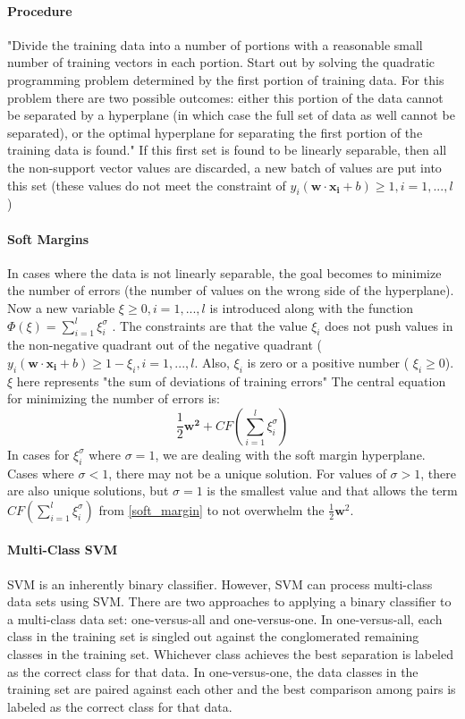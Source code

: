 			\paragraph{Procedure} "Divide the training data into a number of portions with a reasonable small number of training vectors in each portion.  Start out by solving the quadratic programming problem determined by the first portion of training data.  For this problem there are two possible outcomes: either this portion of the data cannot be separated by a hyperplane (in which case the full set of data as well cannot be separated), or the optimal hyperplane for separating the first portion of the training data is found." If this first set is found to be linearly separable, then all the non-support vector values are discarded, a new batch of values are put into this set (these values do not meet the constraint of $y_i(\mathbf{w} \cdot \mathbf{x_i} + b) \ge 1, i = 1,...,{l}$ )
			\paragraph{Soft Margins}
			In cases where the data is not linearly separable, the goal becomes to minimize the number of errors (the number of values on the wrong side of the hyperplane).  Now a new variable $\xi \ge 0, i=1,...,l$ is introduced along with the function $\Phi (\xi) = \sum_{i=1}^{l} \xi_{i}^{\sigma}$ .  The constraints are that the value 
			$\xi_i$ does not push values in the non-negative quadrant out of the negative quadrant ( $y_i(\mathbf{w} \cdot \mathbf{x_i} + b) \ge 1 - \xi_i, i=1,...,l$.  Also, $\xi_i$ is zero or a positive number ( $\xi_i \ge 0$).  $\xi$ here represents "the sum of deviations of training errors"
			The central equation for minimizing the number of errors is:
			\begin{equation}\label{soft_margin}  \frac{1}{2}\mathbf{w^2} + CF(\sum_{i=1}^{l} \xi_{i}^\sigma)\end{equation}
			In cases for $ \xi_{i}^{\sigma} $ where $\sigma=1$, we are dealing with the soft margin hyperplane.  Cases where $\sigma < 1$, there may not be a unique solution.  For values of $\sigma > 1$, there are also unique solutions, but $\sigma =1$ is the smallest value and that allows the term $CF(\sum_{i=1}^{l} \xi_{i}^\sigma)$ from \eqref{soft_margin} to not overwhelm  the $\frac{1}{2}\mathbf{w}^2$.\cite{vapnik_support-vector_1995}
			\paragraph{Multi-Class SVM}  SVM is an inherently binary classifier.  However, SVM can process multi-class data sets using SVM.  There are two approaches to applying a binary classifier to a multi-class data set: one-versus-all and one-versus-one.  In one-versus-all, each class in the training set is singled out against the conglomerated remaining classes in the training set.  Whichever class achieves the best separation is labeled as the correct class for that data.  In one-versus-one, the data classes in the training set are paired against each other and the best comparison among pairs is labeled as the correct class for that data.  
